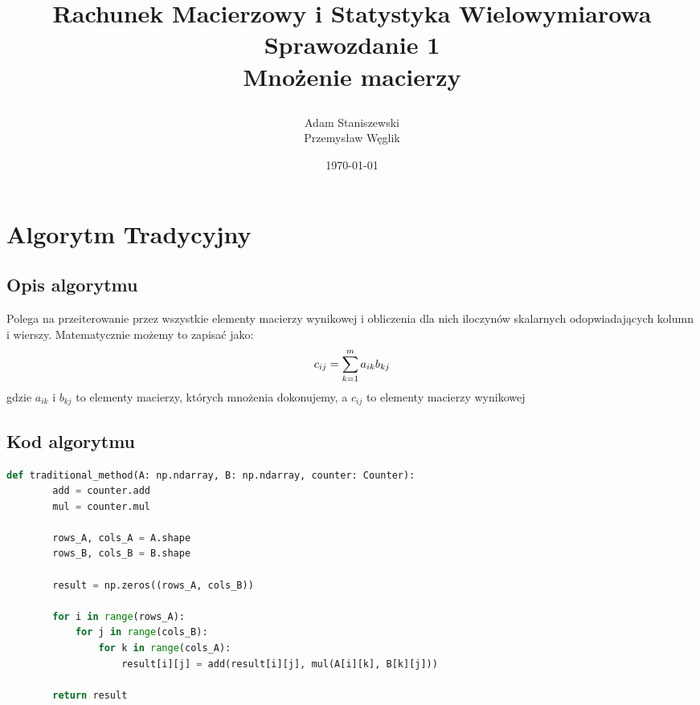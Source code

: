 \documentclass[12pt,a4paper,table]{article}
\begin{document}
    \title {
        Rachunek Macierzowy i Statystyka Wielowymiarowa \\
        Sprawozdanie 1 \\
        Mnożenie macierzy

    }

    \author{
        Adam Staniszewski \\
        Przemysław Węglik
    }

    \date{\today}

    \maketitle

    \tableofcontents
    \newpage

    \section{Algorytm Tradycyjny}

    \subsection{Opis algorytmu}
    Polega na przeiterowanie przez wszystkie elementy macierzy wynikowej i obliczenia dla nich iloczynów skalarnych odopwiadających kolumn i wierszy.
    Matematycznie możemy to zapisać jako:
    $$
    c_{ij}
    =
    \sum_{k=1}^{m} a_{ik}b_{kj} \\
    $$
    gdzie $a_{ik}$  i $b_{kj}$ to elementy macierzy, których mnożenia dokonujemy, a $c_{ij}$ to elementy macierzy wynikowej
    
    \subsection{Kod algorytmu}
    \begin{lstlisting}[language=Python]
    def traditional_method(A: np.ndarray, B: np.ndarray, counter: Counter):
        add = counter.add
        mul = counter.mul
        
        rows_A, cols_A = A.shape
        rows_B, cols_B = B.shape
        
        result = np.zeros((rows_A, cols_B))

        for i in range(rows_A):
            for j in range(cols_B):
                for k in range(cols_A):
                    result[i][j] = add(result[i][j], mul(A[i][k], B[k][j]))
        
        return result
    \end{lstlisting}
\end{document}
